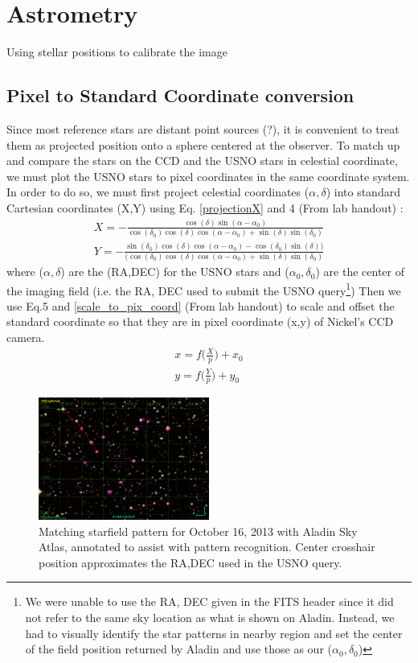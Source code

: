 \documentclass[authoryear, 12pt,5p, times]{elsarticle}
\begin{document}
\section{Astrometry}
Using stellar positions to calibrate the image
\subsection{Pixel to Standard Coordinate conversion}
Since most reference stars are distant point sources (?), it is convenient to treat them as projected position onto a sphere centered at the observer. To match up and compare the stars on the CCD and the USNO stars in celestial coordinate, we must plot the USNO stars to pixel coordinates in the same coordinate system. In order to do so, we must first project celestial coordinates ($\alpha,\delta $) into standard Cartesian coordinates (X,Y) using Eq. \ref{projectionX} and 4 (From lab handout) : 
\begin{align}
X = -\frac{\cos(\delta) \sin(\alpha-\alpha_0)}{\cos(\delta_0)\cos(\delta)\cos(\alpha-\alpha_0)+\sin(\delta) \sin(\delta_0)}
\\ Y= -\frac{\sin(\delta_0)\cos(\delta)\cos(\alpha-\alpha_0)-\cos(\delta_0)\sin(\delta))}{(\cos(\delta_0)\cos(\delta)\cos(\alpha-\alpha_0)+\sin(\delta)\sin(\delta_0)}
\label{projectionX}
\end{align}
where ($\alpha,\delta $) are the (RA,DEC) for the USNO stars and ($\alpha_0,\delta_0$) are the center of the imaging field (i.e. the RA, DEC used to submit the USNO query\footnote{We were unable to use the RA, DEC given in the FITS header since it did not refer to the same sky location as what is shown on Aladin. Instead, we had to visually identify the star patterns in nearby region and set the center of the field position returned by Aladin and use those as our ($\alpha_0,\delta_0$) })
Then we use Eq.5 and \ref{scale_to_pix_coord} (From lab handout) to scale and offset the standard coordinate so that they are in pixel coordinate (x,y)  of Nickel's CCD camera. 
\begin{align}
x  = f \Bigg(\frac{X}{p}\Bigg)+x_0
\\ y  = f \Bigg(\frac{Y}{p}\Bigg)+y_0
\label{scale_to_pix_coord}
\end{align}
\begin{figure}[h!]
\includegraphics[width=0.5\textwidth]{figures/aladin10162013}
\caption{ Matching starfield pattern for October 16, 2013 with Aladin Sky Atlas, annotated to assist with  pattern recognition. Center crosshair position approximates the RA,DEC used in the USNO query. }
\label{aladin10162013}
\end{figure}
\end{document}

